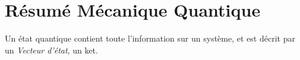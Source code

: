 \section*{Résumé Mécanique Quantique}
Un état quantique contient toute l'information sur un système, et est décrit par un
\textit{Vecteur d'état}, un ket.

